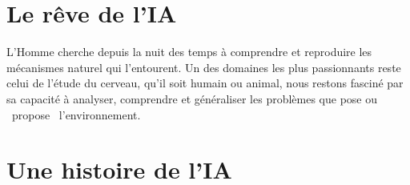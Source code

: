 \section{Le rêve de l'IA}
L'Homme cherche depuis la nuit des temps à comprendre et reproduire les mécanismes naturel qui l'entourent. Un des domaines les plus passionnants reste celui de l'étude du cerveau, qu'il soit humain ou animal, nous restons fasciné par sa capacité à analyser, comprendre et généraliser les problèmes que pose ou \og{}~propose~\fg{} l'environnement.
\section{Une histoire de l'IA}